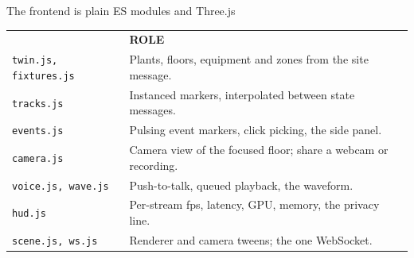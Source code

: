 \begin{frame}{The frontend is plain ES modules and Three.js}
  \footnotesize
  \begin{tabular}{@{}>{\raggedright\arraybackslash}p{}>{\raggedright\arraybackslash}p{}@{}}
    {\scriptsize\bfseries\color{triadPrimary}MODULE} & {\scriptsize\bfseries\color{triadPrimary}ROLE}\\[0.9ex]
    \texttt{twin.js, fixtures.js} & \textcolor{triadMuted}{Plants, floors, equipment and zones from the site message.}\\[0.45ex]
    \texttt{tracks.js} & \textcolor{triadMuted}{Instanced markers, interpolated between state messages.}\\[0.45ex]
    \texttt{events.js} & \textcolor{triadMuted}{Pulsing event markers, click picking, the side panel.}\\[0.45ex]
    \texttt{camera.js} & \textcolor{triadMuted}{Camera view of the focused floor; share a webcam or recording.}\\[0.45ex]
    \texttt{voice.js, wave.js} & \textcolor{triadMuted}{Push-to-talk, queued playback, the waveform.}\\[0.45ex]
    \texttt{hud.js} & \textcolor{triadMuted}{Per-stream fps, latency, GPU, memory, the privacy line.}\\[0.45ex]
    \texttt{scene.js, ws.js} & \textcolor{triadMuted}{Renderer and camera tweens; the one WebSocket.}\\
  \end{tabular}
\end{frame}

